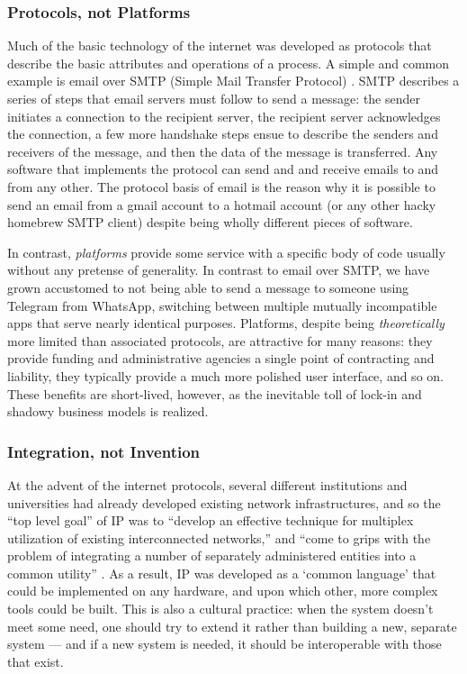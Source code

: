 \documentclass[10pt]{article}
\begin{document}
\begin{multicols}{2}
\hypertarget{protocols-not-platforms}{%
\subsubsection{Protocols, not Platforms}\label{protocols-not-platforms}}

Much of the basic technology of the internet was developed as protocols
that describe the basic attributes and operations of a process. A simple
and common example is email over SMTP (Simple Mail Transfer Protocol)
\cite{Rfc5321SimpleMail} . SMTP describes a series of steps that
email servers must follow to send a message: the sender initiates a
connection to the recipient server, the recipient server acknowledges
the connection, a few more handshake steps ensue to describe the senders
and receivers of the message, and then the data of the message is
transferred. Any software that implements the protocol can send and and
receive emails to and from any other. The protocol basis of email is the
reason why it is possible to send an email from a gmail account to a
hotmail account (or any other hacky homebrew SMTP client) despite being
wholly different pieces of software.

In contrast, \emph{platforms} provide some service with a specific body
of code usually without any pretense of generality. In contrast to email
over SMTP, we have grown accustomed to not being able to send a message
to someone using Telegram from WhatsApp, switching between multiple
mutually incompatible apps that serve nearly identical purposes.
Platforms, despite being \emph{theoretically} more limited than
associated protocols, are attractive for many reasons: they provide
funding and administrative agencies a single point of contracting and
liability, they typically provide a much more polished user interface,
and so on. These benefits are short-lived, however, as the inevitable
toll of lock-in and shadowy business models is realized.

\hypertarget{integration-not-invention}{%
\subsubsection{Integration, not
Invention}\label{integration-not-invention}}

At the advent of the internet protocols, several different institutions
and universities had already developed existing network infrastructures,
and so the ``top level goal'' of IP was to ``develop an effective
technique for multiplex utilization of existing interconnected
networks,'' and ``come to grips with the problem of integrating a number
of separately administered entities into a common utility'' \cite{clarkDesignPhilosophyDARPA1988} . As a result, IP was developed as a
`common language' that could be implemented on any hardware, and upon
which other, more complex tools could be built. This is also a cultural
practice: when the system doesn't meet some need, one should try to
extend it rather than building a new, separate system --- and if a new
system is needed, it should be interoperable with those that exist.


\end{multicols}
\end{document}
